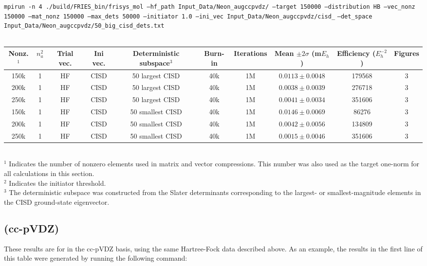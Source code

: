 \documentclass[12pt, landscape]{article}
\begin{document}
\texttt{mpirun -n 4 ./build/FRIES\_bin/frisys\_mol --hf\_path Input\_Data/Neon\_augccpvdz/ --target 150000 --distribution HB --vec\_nonz 150000 --mat\_nonz 150000 --max\_dets 50000 --initiator 1.0 --ini\_vec Input\_Data/Neon\_augccpvdz/cisd\_} \texttt{--det\_space Input\_Data/Neon\_augccpvdz/50\_big\_cisd\_dets.txt}
\\~\\
\begin{tabular}{c|c|c|c|c|c|c|c|c|c}
Nonz.$^1$ & $n_a^2$ & Trial vec. & Ini vec. & Deterministic subspace$^3$ & Burn-in & Iterations & Mean $\pm 2 \sigma$ (m$E_h$) & Efficiency ($E_h^{-2}$) & Figures \\ \hline
150k & 1 & HF & CISD & 50 largest CISD & 40k & 1M & $0.0113 \pm 0.0048$ & 179568 & 3 \\
200k & 1 & HF & CISD & 50 largest CISD & 40k & 1M & $0.0038 \pm 0.0039$ & 276718 & 3 \\
250k & 1 & HF & CISD & 50 largest CISD & 40k & 1M & $0.0041 \pm 0.0034$ & 351606 & 3 \\
150k & 1 & HF & CISD & 50 smallest CISD & 40k & 1M & $0.0146 \pm 0.0069$ & 86276 & 3 \\
200k & 1 & HF & CISD & 50 smallest CISD & 40k & 1M & $0.0042 \pm 0.0056$ & 134809 & 3 \\
250k & 1 & HF & CISD & 50 smallest CISD & 40k & 1M & $0.0015 \pm 0.0046$ & 351606 & 3 \\
\end{tabular}
\\
$^1$ Indicates the number of nonzero elements used in matrix and vector compressions. This number was also used as the target one-norm for all calculations in this section. \\
$^2$ Indicates the initiator threshold. \\
$^3$ The deterministic subspace was constructed from the Slater determinants corresponding to the largest- or smallest-magnitude elements in the CISD ground-state eigenvector.

\subsection*{ (cc-pVDZ)}
These results are for  in the cc-pVDZ basis, using the same Hartree-Fock data described above. As an example, the results in the first line of this table were generated by running the following command:
\end{document}
